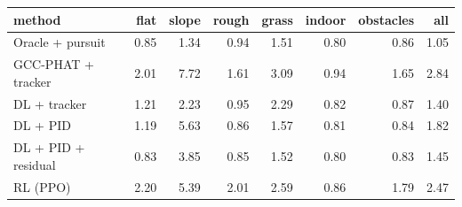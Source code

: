 \begin{tabular}{lrrrrrrr}
\toprule
method & flat & slope & rough & grass & indoor & obstacles & all\\
\midrule
Oracle + pursuit & 0.85 & 1.34 & 0.94 & 1.51 & 0.80 & 0.86 & 1.05 \\
GCC-PHAT + tracker & 2.01 & 7.72 & 1.61 & 3.09 & 0.94 & 1.65 & 2.84 \\
DL + tracker & 1.21 & 2.23 & 0.95 & 2.29 & 0.82 & 0.87 & 1.40 \\
DL + PID & 1.19 & 5.63 & 0.86 & 1.57 & 0.81 & 0.84 & 1.82 \\
DL + PID + residual & 0.83 & 3.85 & 0.85 & 1.52 & 0.80 & 0.83 & 1.45 \\
RL (PPO) & 2.20 & 5.39 & 2.01 & 2.59 & 0.86 & 1.79 & 2.47 \\
\bottomrule
\end{tabular}
